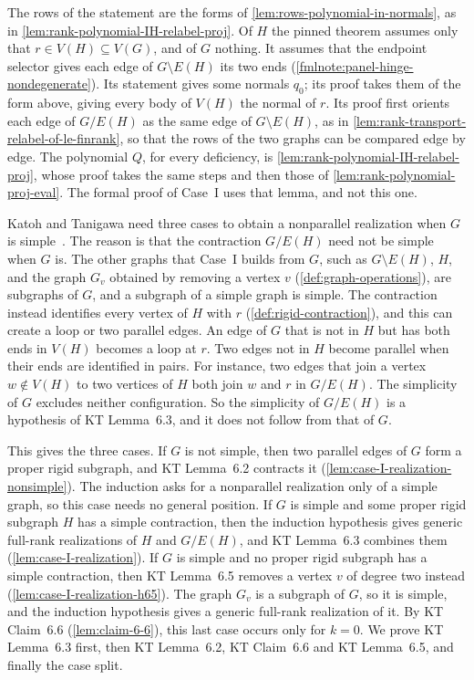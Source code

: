 \begin{fmlnote}
  The rows of the statement are the forms of
  \cref{lem:rows-polynomial-in-normals}, as in
  \cref{lem:rank-polynomial-IH-relabel-proj}. Of $H$ the pinned theorem
  assumes only that $r \in V(H) \subseteq V(G)$, and of $G$ nothing. It
  assumes that the endpoint selector gives each edge of
  $G \setminus E(H)$ its two ends
  (\cref{fmlnote:panel-hinge-nondegenerate}). Its statement gives some
  normals $q_0$; its proof takes them of the form above, giving every
  body of $V(H)$ the normal of $r$. Its proof first
  orients each edge of $G/E(H)$ as the same edge of $G \setminus E(H)$, as in
  \cref{lem:rank-transport-relabel-of-le-finrank}, so that the rows of
  the two graphs can be compared edge by edge. The polynomial $Q$, for
  every deficiency, is \cref{lem:rank-polynomial-IH-relabel-proj}, whose
  proof takes the same steps and then those of
  \cref{lem:rank-polynomial-proj-eval}. The formal proof of Case~I uses
  that lemma, and not this one.
\end{fmlnote}

Katoh and Tanigawa need three cases to obtain a nonparallel realization
when $G$ is simple~\cite[pp.~673--676]{katohTanigawa2011}. The reason
is that the contraction $G/E(H)$ need not be simple when $G$ is. The
other graphs that Case~I builds from $G$, such as $G \setminus E(H)$,
$H$, and the graph $G_v$ obtained by removing a vertex $v$
(\cref{def:graph-operations}), are subgraphs of $G$, and a subgraph of a
simple graph is simple. The contraction instead identifies every vertex
of $H$ with $r$ (\cref{def:rigid-contraction}), and this can create a
loop or two parallel edges. An edge of $G$ that is not in $H$ but has
both ends in $V(H)$ becomes a loop at $r$. Two edges not in $H$ become
parallel when their ends are identified in pairs. For instance, two
edges that join a vertex $w \notin V(H)$ to two vertices of $H$ both
join $w$ and $r$ in $G/E(H)$. The simplicity of $G$ excludes neither
configuration. So the simplicity of $G/E(H)$ is a hypothesis of KT
Lemma~6.3, and it does not follow from that of $G$.

This gives the three cases. If $G$ is not simple, then two parallel
edges of $G$ form a proper rigid subgraph, and KT Lemma~6.2 contracts it
(\cref{lem:case-I-realization-nonsimple}). The induction asks for a
nonparallel realization only of a simple graph, so this case needs no
general position. If $G$ is simple and some proper rigid subgraph $H$
has a simple contraction, then the induction hypothesis gives generic
full-rank realizations of $H$ and $G/E(H)$, and KT Lemma~6.3 combines
them (\cref{lem:case-I-realization}). If $G$ is simple and no proper
rigid subgraph has a simple contraction, then KT Lemma~6.5 removes a
vertex $v$ of degree two instead (\cref{lem:case-I-realization-h65}).
The graph $G_v$ is a subgraph of $G$, so it is simple, and the induction
hypothesis gives a generic full-rank realization of it. By KT
Claim~6.6 (\cref{lem:claim-6-6}), this last case occurs only for
$k = 0$. We prove KT Lemma~6.3 first, then KT Lemma~6.2, KT Claim~6.6
and KT Lemma~6.5, and finally the case split.

